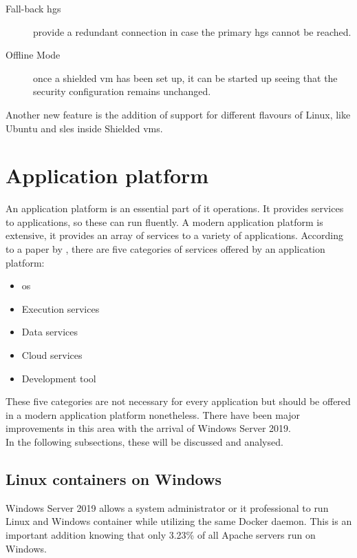 \begin{description}
	\item[Fall-back \acrshort{hgs}] provide a redundant connection in case the primary \acrshort{hgs} cannot be reached.
	\item[Offline Mode] once a shielded \acrshort{vm} has been set up, it can be started up seeing that the security configuration remains unchanged.
\end{description}

Another new feature is the addition of support for different flavours of Linux, like Ubuntu and \acrfull{sles} inside Shielded \acrshort{vm}s. 

\clearpage

\section{Application platform}
An application platform is an essential part of \acrshort{it} operations. 
It provides services to applications, so these can run fluently. 
A modern application platform is extensive, it provides an array of services to a variety of applications. 
According to a paper by \textcite{Chappell2011}, there are five categories of services offered by an application platform:

\begin{itemize}
	\item \acrshort{os}
	\item Execution services
	\item Data services
	\item Cloud services
	\item Development tool
\end{itemize}

These five categories are not necessary for every application but should be offered in a modern application platform nonetheless.
There have been major improvements in this area with the arrival of Windows Server 2019. \autocite{Gerend2018} 
\\
In the following subsections, these will be discussed and analysed.

\subsection*{Linux containers on Windows}
Windows Server 2019 allows a system administrator or \acrshort{it} professional to run Linux and Windows container while utilizing the same Docker daemon. 
This is an important addition knowing that only 3.23\% of all Apache servers run on Windows. \autocite{SecuritySpace2019}
